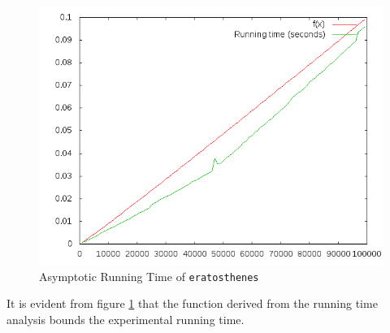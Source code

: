 \documentclass{amsart}
\theoremstyle{definition}
\theoremstyle{case}
\begin{document}
	\begin{figure}\caption{Asymptotic Running Time of \texttt{eratosthenes}}
		\label{runtime1}
		\includegraphics[scale=0.5]{erat3.png}
	\end{figure}
	
	It is evident from figure \ref{runtime1} that the function derived from the running time analysis bounds the experimental running time.
\end{document}
